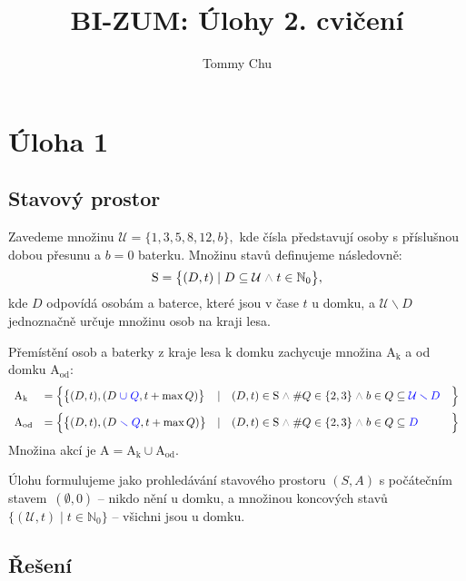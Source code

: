 \documentclass{article}
\title{BI-ZUM: Úlohy 2. cvičení}
\author{Tommy Chu}
\date{}
\newcommand{\Nz}{\mathbb{N}_0}
\newcommand{\U}{\mathcal{U}}
\newcommand{\mS}{\text{S}}
\newcommand{\A}{\text{A}}
\newcommand{\mand}{\;{\color{gray} \land}\;}
\begin{document}
\maketitle

\section*{Úloha 1}

\subsection*{Stavový prostor}

Zavedeme množinu
\(
\U = \{ 1, 3, 5, 8, 12, b \},
\)
kde čísla představují osoby s příslušnou dobou přesunu a $b = 0$ baterku.
Množinu stavů definujeme následovně:
\[
    \mS = \big\{
    (D, t) \mid D \subseteq \U \mand t \in \Nz
    \big\},
\]
kde $D$ odpovídá osobám a baterce, které jsou v čase $t$ u domku, a $\U \smallsetminus D$ jednoznačně určuje množinu osob na kraji lesa.

Přemístění osob a baterky z kraje lesa k domku zachycuje množina $\A_\text{k}$
a od domku $\A_\text{od}$:
\[
    \begin{array}{llllll}
        \A_\text{k}
         & = \Big\{
        \big\{ (D, t), (D {\color{blue} \;\cup\; Q}, t + \max Q) \big\}
         & \mid
         & (D, t) \in \mS \mand \# Q \in \{2, 3\}
        \mand b \in Q \subseteq  {\color{blue} \U\smallsetminus D}
         & \Big\}

        \\[3mm]

        \A_\text{od}
         & = \Big\{
        \big\{ (D, t), (D {\color{blue} \;\smallsetminus\; Q}, t + \max Q) \big\}
         & \mid
         & (D, t) \in \mS \mand \# Q \in \{2, 3\}
        \mand b \in Q \subseteq {\color{blue} D}
         & \Big\}
    \end{array}
\]
Množina akcí je $\A = \A_\text{k} \cup \A_\text{od}$.

Úlohu formulujeme jako prohledávání stavového prostoru $(S, A)$ s počátečním stavem~$(\emptyset, 0)$ -- nikdo nění u domku, a množinou koncových stavů~$\{ (\U, t) \mid t \in \Nz \}$ -- všichni jsou u domku.

\subsection*{Řešení}
\end{document}
